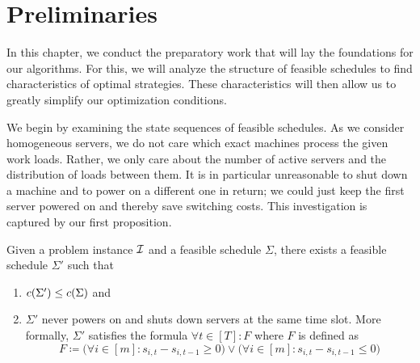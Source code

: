 
\chapter{Preliminaries}\label{chap:preliminaries}
In this chapter, we conduct the preparatory work that will lay the foundations for our algorithms. For this, we will analyze the structure of feasible schedules to find characteristics of optimal strategies. These characteristics will then allow us to greatly simplify our optimization conditions.

We begin by examining the state sequences of feasible schedules. As we consider homogeneous servers, we do not care which exact machines process the given work loads. Rather, we only care about the number of active servers and the distribution of loads between them. It is in particular unreasonable to shut down a machine and to power on a different one in return; we could just keep the first server powered on and thereby save switching costs.
This investigation is captured by our first proposition.
\begin{prop}\label{prop:reasonable_switching}
Given a problem instance $\mathcal{I}$ and a feasible schedule $\Sigma$, there exists a feasible schedule $\Sigma'$ such that 
\begin{enumerate}[label=(\roman*)]
		\item $c(\Sigma')\le c(\Sigma)$ and 
		\item $\Sigma'$ never powers on and shuts down servers at the same time slot. More formally, $\Sigma'$ satisfies the formula $\forall t\in[T]:F$ where $F$ is defined as
\begin{equation}
	F\coloneqq\bigl(\forall i\in[m]:s_{i,t}-s_{i,t-1}\ge0\bigr)\lor\bigl(\forall i\in[m]:s_{i,t}-s_{i,t-1}\le 0\bigr)\label{eq:reasonable_switching}
\end{equation}\label{itm:cond_reasonable_switching}
\vspace{-\baselineskip}\vspace{-\belowdisplayskip}
\end{enumerate}
\end{prop}
